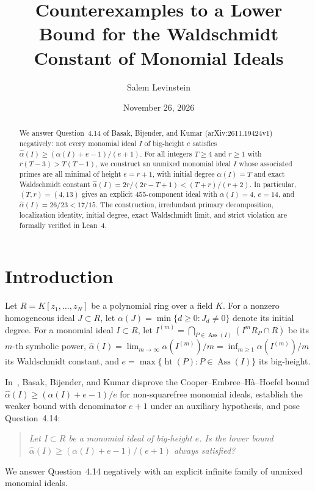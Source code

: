 \documentclass[11pt]{article}
\title{Counterexamples to a Lower Bound for the Waldschmidt Constant of Monomial Ideals}
\author{Salem Levinstein}
\date{November 26, 2026}
\newcommand{\Ass}{\operatorname{Ass}}
\newcommand{\htp}{\operatorname{ht}}
\begin{document}
\maketitle

\begin{abstract}
We answer Question~4.14 of Basak, Bijender, and Kumar (arXiv:2611.19424v1) negatively: not every monomial ideal $I$ of big-height $e$ satisfies $\widehat{\alpha}(I) \ge (\alpha(I) + e - 1)/(e + 1)$. For all integers $T \ge 4$ and $r \ge 1$ with $r(T - 3) > T(T - 1)$, we construct an unmixed monomial ideal $I$ whose associated primes are all minimal of height $e = r + 1$, with initial degree $\alpha(I) = T$ and exact Waldschmidt constant $\widehat{\alpha}(I) = 2r / (2r - T + 1) < (T + r)/(r + 2)$. In particular, $(T, r) = (4, 13)$ gives an explicit $455$-component ideal with $\alpha(I) = 4$, $e = 14$, and $\widehat{\alpha}(I) = 26/23 < 17/15$. The construction, irredundant primary decomposition, localization identity, initial degree, exact Waldschmidt limit, and strict violation are formally verified in Lean~4.
\end{abstract}

\section{Introduction}

Let $R = K[z_1, \dots, z_N]$ be a polynomial ring over a field $K$. For a nonzero homogeneous ideal $J \subset R$, let $\alpha(J) = \min\{d \ge 0 : J_d \ne 0\}$ denote its initial degree. For a monomial ideal $I \subset R$, let $I^{(m)} = \bigcap_{P \in \Ass(I)} (I^m R_P \cap R)$ be its $m$-th symbolic power, $\widehat{\alpha}(I) = \lim_{m \to \infty} \alpha(I^{(m)})/m = \inf_{m \ge 1} \alpha(I^{(m)})/m$ its Waldschmidt constant, and $e = \max\{\htp(P) : P \in \Ass(I)\}$ its big-height.

In~\cite{Basak2026}, Basak, Bijender, and Kumar disprove the Cooper--Embree--H\`a--Hoefel bound $\widehat{\alpha}(I) \ge (\alpha(I) + e - 1)/e$ for non-squarefree monomial ideals, establish the weaker bound with denominator $e + 1$ under an auxiliary hypothesis, and pose Question~4.14:
\begin{quote}
\emph{Let $I \subset R$ be a monomial ideal of big-height $e$. Is the lower bound $\widehat{\alpha}(I) \ge (\alpha(I) + e - 1)/(e + 1)$ always satisfied?}
\end{quote}

We answer Question~4.14 negatively with an explicit infinite family of unmixed monomial ideals.
\end{document}

